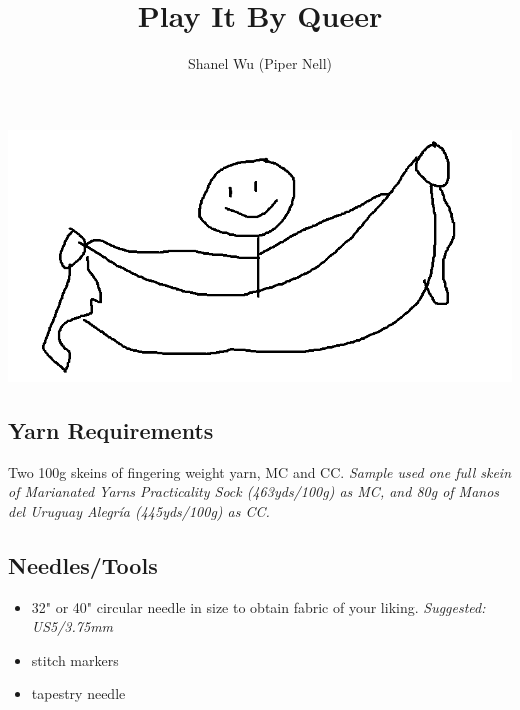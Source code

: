 \documentclass[12pt]{article}
\title{Play It By Queer} %
\author{Shanel Wu (Piper Nell)}
\begin{document}
\begin{titlingpage}


{\selectfont
\HUGE\textbf{\thetitle}
\hfill %
\normalsize\theauthor
}

\includegraphics[width=\linewidth]{cover_PH}

\begin{multicols}{2}
\small

\subsection*{Yarn Requirements}

Two 100g skeins of fingering weight yarn, MC and CC. 
\emph{Sample used one full skein of Marianated Yarns Practicality Sock (463yds/100g) as MC, and 80g of Manos del Uruguay Alegr\'{i}a (445yds/100g) as CC.} %

\subsection*{Needles/Tools}

\begin{itemize}
\item 32" or 40" circular needle in size to obtain fabric of your liking. \emph{Suggested: US5/3.75mm} %
\item stitch markers
\item tapestry needle
\end{itemize}


\end{multicols}
\end{titlingpage}
\end{document}
